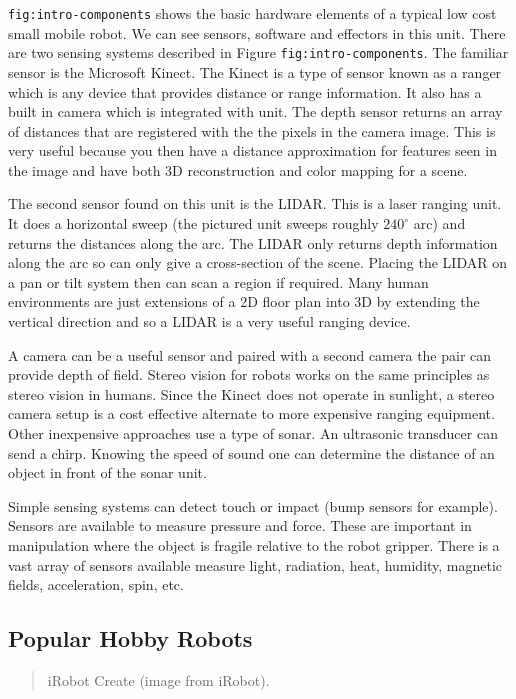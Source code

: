 \texttt{fig:intro-components} shows the basic hardware elements of a
typical low cost small mobile robot. We can see sensors, software and
effectors in this unit. There are two sensing systems described in
Figure \texttt{fig:intro-components}. The familiar sensor is the
Microsoft Kinect. The Kinect is a type of sensor known as a ranger which
is any device that provides distance or range information. It also has a
built in camera which is integrated with unit. The depth sensor returns
an array of distances that are registered with the the pixels in the
camera image. This is very useful because you then have a distance
approximation for features seen in the image and have both 3D
reconstruction and color mapping for a scene.

The second sensor found on this unit is the LIDAR. This is a laser
ranging unit. It does a horizontal sweep (the pictured unit sweeps
roughly \(240^\circ\) arc) and returns the distances along the arc. The
LIDAR only returns depth information along the arc so can only give a
cross-section of the scene. Placing the LIDAR on a pan or tilt system
then can scan a region if required. Many human environments are just
extensions of a 2D floor plan into 3D by extending the vertical
direction and so a LIDAR is a very useful ranging device.

A camera can be a useful sensor and paired with a second camera the pair
can provide depth of field. Stereo vision for robots works on the same
principles as stereo vision in humans. Since the Kinect does not operate
in sunlight, a stereo camera setup is a cost effective alternate to more
expensive ranging equipment. Other inexpensive approaches use a type of
sonar. An ultrasonic transducer can send a chirp. Knowing the speed of
sound one can determine the distance of an object in front of the sonar
unit.

Simple sensing systems can detect touch or impact (bump sensors for
example). Sensors are available to measure pressure and force. These are
important in manipulation where the object is fragile relative to the
robot gripper. There is a vast array of sensors available measure light,
radiation, heat, humidity, magnetic fields, acceleration, spin, etc.

\hypertarget{popular-hobby-robots}{%
\subsection{Popular Hobby Robots}\label{popular-hobby-robots}}

\begin{quote}
iRobot Create (image from iRobot).
\end{quote}

